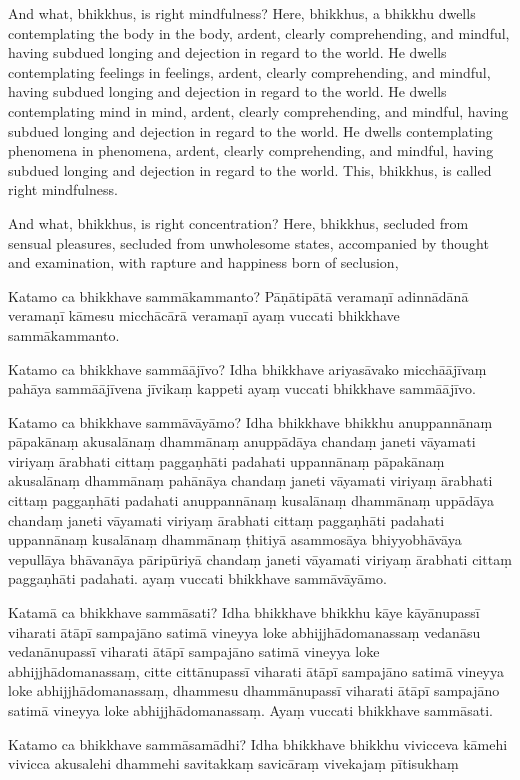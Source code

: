And what, bhikkhus, is right mindfulness? Here, bhikkhus, a bhikkhu dwells
contemplating the body in the body, ardent, clearly comprehending, and mindful,
having subdued longing and dejection in regard to the world. He dwells
contemplating feelings in feelings, ardent, clearly comprehending, and mindful,
having subdued longing and dejection in regard to the world. He dwells
contemplating mind in mind, ardent, clearly comprehending, and mindful, having
subdued longing and dejection in regard to the world. He dwells contemplating
phenomena in phenomena, ardent, clearly comprehending, and mindful, having
subdued longing and dejection in regard to the world. This, bhikkhus, is called
right mindfulness.

And what, bhikkhus, is right concentration? Here, bhikkhus, secluded from
sensual pleasures, secluded from unwholesome states, accompanied by thought and
examination, with rapture and happiness born of seclusion,

\paliPage

Katamo ca bhikkhave sammākammanto? Pāṇātipātā veramaṇī adinnādānā veramaṇī
kāmesu micchācārā veramaṇī ayaṃ vuccati bhikkhave sammākammanto.

Katamo ca bhikkhave sammāājīvo? Idha bhikkhave ariyasāvako micchāājīvaṃ pahāya
sammāājīvena jīvikaṃ kappeti ayaṃ vuccati bhikkhave sammāājīvo.

Katamo ca bhikkhave sammāvāyāmo? Idha bhikkhave bhikkhu anuppannānaṃ pāpakānaṃ
akusalānaṃ dhammānaṃ anuppādāya chandaṃ janeti vāyamati viriyaṃ ārabhati cittaṃ
paggaṇhāti padahati uppannānaṃ pāpakānaṃ akusalānaṃ dhammānaṃ pahānāya chandaṃ
janeti vāyamati viriyaṃ ārabhati cittaṃ paggaṇhāti padahati anuppannānaṃ
kusalānaṃ dhammānaṃ uppādāya chandaṃ janeti vāyamati viriyaṃ ārabhati cittaṃ
paggaṇhāti padahati uppannānaṃ kusalānaṃ dhammānaṃ ṭhitiyā asammosāya
bhiyyobhāvāya vepullāya bhāvanāya pāripūriyā chandaṃ janeti vāyamati viriyaṃ
ārabhati cittaṃ paggaṇhāti padahati. ayaṃ vuccati bhikkhave sammāvāyāmo.

Katamā ca bhikkhave sammāsati? Idha bhikkhave bhikkhu kāye kāyānupassī viharati
ātāpī sampajāno satimā vineyya loke abhijjhādomanassaṃ vedanāsu vedanānupassī
viharati ātāpī sampajāno satimā vineyya loke abhijjhādomanassaṃ, citte
cittānupassī viharati ātāpī sampajāno satimā vineyya loke abhijjhādomanassaṃ,
dhammesu dhammānupassī viharati ātāpī sampajāno satimā vineyya loke
abhijjhādomanassaṃ. Ayaṃ vuccati bhikkhave sammāsati.

Katamo ca bhikkhave sammāsamādhi? Idha bhikkhave bhikkhu vivicceva kāmehi
vivicca akusalehi dhammehi savitakkaṃ savicāraṃ vivekajaṃ pītisukhaṃ


